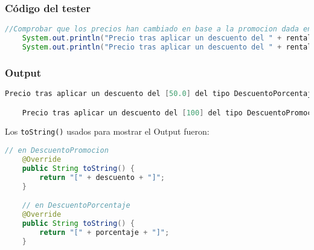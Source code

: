 \subsubsection*{Código del tester}
\begin{lstlisting}[style = javaNormal, language=Java] 
    //Comprobar que los precios han cambiado en base a la promocion dada en el sistema
    System.out.println("Precio tras aplicar un descuento del " + rental1.getDescuento().toString() + " del tipo " + rental1.getDescuento().getClass().getName() + ": " + rental1.getPrice() + "\n");
    System.out.println("Precio tras aplicar un descuento del " + rental2.getDescuento().toString() + " del tipo " + rental2.getDescuento().getClass().getName() + ": " + rental2.getPrice() + "\n");
\end{lstlisting}


\subsubsection*{Output}

\begin{lstlisting}[style = javaNormal, language=Java] 
    Precio tras aplicar un descuento del [50.0] del tipo DescuentoPorcentaje: 225

    Precio tras aplicar un descuento del [100] del tipo DescuentoPromocion: 400
\end{lstlisting}

\vspace{1cm}

\newpage

Los \texttt{toString()} usados para mostrar el Output fueron:

\begin{lstlisting}[style = javaEspecifico, language=Java] 
    // en DescuentoPromocion
    @Override
    public String toString() {
        return "[" + descuento + "]";
    }

    // en DescuentoPorcentaje
    @Override
    public String toString() {
        return "[" + porcentaje + "]";
    }
\end{lstlisting}